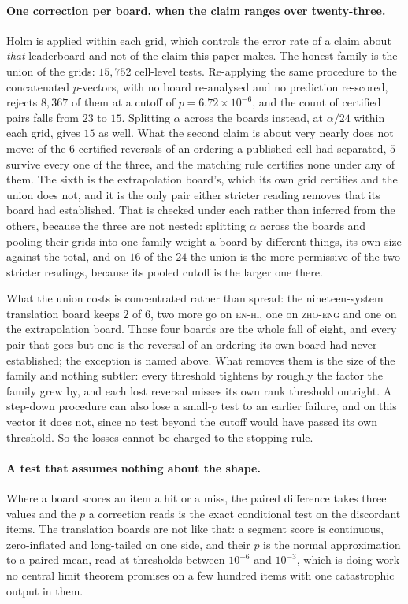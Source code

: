 \paragraph{One correction per board, when the claim ranges over twenty-three.} Holm is applied
within each grid, which controls the error rate of a claim about \emph{that} leaderboard and not of
the claim this paper makes. The honest family is the union of the grids: $15{,}752$ cell-level
tests. Re-applying the same procedure to the concatenated $p$-vectors, with no board re-analysed and no prediction re-scored, rejects $8{,}367$ of them at a cutoff of $p=6.72\times10^{-6}$, and the
count of certified pairs falls from $23$ to $15$. Splitting $\alpha$ across the boards instead, at
$\alpha/24$ within each grid, gives $15$ as well. What the second claim is about very nearly does
not move: of the $6$ certified reversals of an ordering a published cell had separated, $5$ survive
every one of the three, and the matching rule certifies none under any of them. The sixth is the
extrapolation board's, which its own grid certifies and the union does not, and it is the only pair
either stricter reading removes that its board had established. That is checked under each
rather than inferred from the others, because the three are not nested: splitting $\alpha$ across
the boards and pooling their grids into one family weight a board by different things, its own size against the total, and on $16$ of the $24$ the union is the more permissive of
the two stricter readings, because its pooled cutoff is the larger one there.

What the union costs is concentrated rather than spread: the nineteen-system translation board
keeps $2$ of $6$, two more go on \textsc{en-hi}, one on \textsc{zho-eng} and one on the
extrapolation board. Those four boards are the whole fall of eight, and every pair that goes but one
is the reversal of an ordering its own board had never established; the exception is named above. What removes them is the size of the
family and nothing subtler: every threshold tightens by roughly the factor the family grew by, and
each lost reversal misses its own rank threshold outright. A step-down procedure can also lose a small-$p$ test to an earlier failure, and on this vector it does not, since no test beyond the
cutoff would have passed its own threshold. So the losses cannot be charged to the stopping rule.

\paragraph{A test that assumes nothing about the shape.} Where a board scores an item a hit or a
miss, the paired difference takes three values and the $p$ a correction reads is the exact
conditional test on the discordant items. The translation boards are not like that: a segment score
is continuous, zero-inflated and long-tailed on one side, and their $p$ is the normal approximation
to a paired mean, read at thresholds between $10^{-6}$ and $10^{-3}$, which is doing work no
central limit theorem promises on a few hundred items with one catastrophic output in them.

